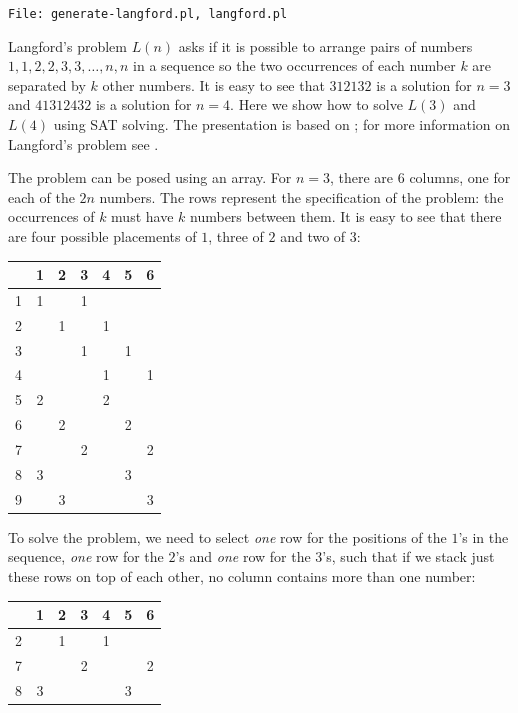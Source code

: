 \documentclass[11pt]{report}
\newcommand*{\p}[1]{\textup{\texttt{#1}}}
\newcommand*{\fl}[1]{\parbox{\textwidth}{\raggedleft \p{File: #1}}}
\begin{document}
\fl{generate-langford.pl, langford.pl}

Langford's problem $L(n)$ asks if it is possible to arrange pairs of numbers $1,1,2,2,3,3,\ldots,n,n$ in a sequence so the two occurrences of each number $k$ are separated by $k$ other numbers. It is easy to see that $312132$ is a solution for $n=3$ and $41312432$ is a solution for $n=4$. Here we show how to solve $L(3)$ and $L(4)$ using SAT solving. The presentation is based on \cite{knuth-sat}; for more information on Langford's problem see \cite{miller-lang}.

The problem can be posed using an array. For $n=3$, there are $6$ columns, one for each of the $2n$ numbers. The rows represent the specification of the problem: the occurrences of $k$ must have $k$ numbers between them. It is easy to see that there are four possible placements of $1$, three of $2$ and two of $3$:

\begin{center}
\begin{tabular}{|c||c|c|c|c|c|c|}
\hline
&1&2&3&4&5&6\\\hline\hline
1&1&&1&&&\\\hline
2&&1&&1&&\\\hline
3&&&1&&1&\\\hline
4&&&&1&&1\\\hline
5&2&&&2&&\\\hline
6&&2&&&2&\\\hline
7&&&2&&&2\\\hline
8&3&&&&3&\\\hline
9&&3&&&&3\\\hline
\end{tabular}
\end{center}

To solve the problem, we need to select \emph{one} row for the positions of the $1$'s in the sequence, \emph{one} row for the $2$'s and \emph{one} row for the $3$'s, such that if we stack just these rows on top of each other, no column contains more than one number:

\begin{center}
\begin{tabular}{|c||c|c|c|c|c|c|}
\hline
&1&2&3&4&5&6\\\hline\hline
2&&1&&1&&\\\hline
7&&&2&&&2\\\hline
8&3&&&&3&\\\hline
\end{tabular}
\end{center}
\end{document}
